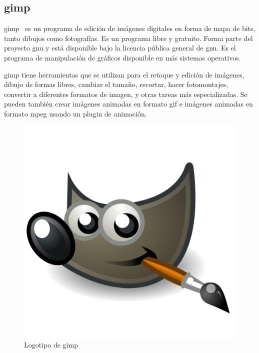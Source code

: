 	\subsection{\acrshort{gimp}}

		\acrfull{gimp}~\cite{gimp} es un programa de edición de imágenes digitales en forma de mapa de bits, tanto dibujos como fotografías. Es un programa libre y gratuito. Forma parte del proyecto \acrshort{gnu} y está disponible bajo la licencia pública general de \acrshort{gnu}. Es el programa de manipulación de gráficos disponible en más sistemas operativos.

		\acrshort{gimp} tiene herramientas que se utilizan para el retoque y edición de imágenes, dibujo de formas libres, cambiar el tamaño, recortar, hacer fotomontajes, convertir a diferentes formatos de imagen, y otras tareas más especializadas. Se pueden también crear imágenes animadas en formato \acrshort{gif} e imágenes animadas en formato \acrshort{mpeg} usando un plugin de animación.

		\begin{figure}[!htp]
			 \centering
			 \includegraphics[scale=.15]{fig/gimp}
			 \caption{Logotipo de \acrshort{gimp}}
			 \label{fig:gimp}
		\end{figure}

		\FloatBarrier

